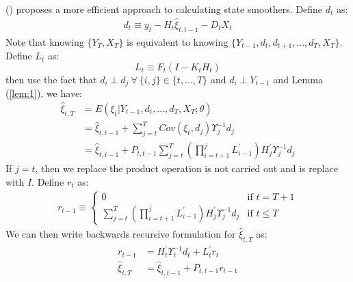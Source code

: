 \documentclass[12pt]{article}
\numberwithin{equation}{section}
\begin{document}
(\cite{dejong_1989}) proposes a more efficient approach to calculating state smoothers. Define $d_t$ as:
\begin{align*}
    d_t \equiv y_t - H_t\hat{\xi}_{t,t-1} - D_tX_t
\end{align*}
Note that knowing $\{Y_T, X_T\}$ is equivalent to knowing $\{Y_{t-1},d_t,d_{t+1},...,d_T, X_T\}$. Define $L_t$ as:
\[
    L_t \equiv F_t(I-K_tH_t) 
\]
then use the fact that $d_i \perp d_j \:\forall\: \{i,j\} \in \{t,...,T\}$ and $d_i \perp Y_{t-1}$ and Lemma (\ref{lem:1}), we have:
\begin{align*}
    \hat{\xi}_{t,T} &= E(\xi_t|Y_{t-1},d_{t},...,d_T,X_T;\theta) \\
    &= \hat{\xi}_{t,t-1} + \sum_{j=t}^{T}Cov(\xi_t,d_j)\Upsilon_j^{-1}d_j \\
    &= \hat{\xi}_{t,t-1} + P_{t,t-1}\sum_{j=t}^T\left(\prod_{i=t+1}^{j}L_{i-1}^{'}\right)H_j^{'}\Upsilon_j^{-1}d_j
\end{align*}
If $j=t$, then we replace the product operation is not carried out and is replace with $I$. Define $r_t$ as:
\begin{align*}
    r_{t-1} \equiv \begin{cases}
        0 & \text{if $t=T+1$} \\
        \sum_{j=t}^T\left(\prod_{i=t+1}^{j}L_{i-1}^{'}\right)H_j^{'}\Upsilon_j^{-1}d_j & \text{if $t\leq T$}
    \end{cases}
\end{align*}
We can then write backwards recursive formulation for $\hat{\xi}_{t,T}$ as:
\begin{align}
    r_{t-1} &= H_t^{'}\Upsilon_t^{-1}d_t + L_t^{'}r_t \label{eq:r1t} \\
    \hat{\xi}_{t,T} &= \hat{\xi}_{t,t-1} + P_{t,t-1}r_{t-1} \label{eq:smooth_state2}
\end{align}
\end{document}
